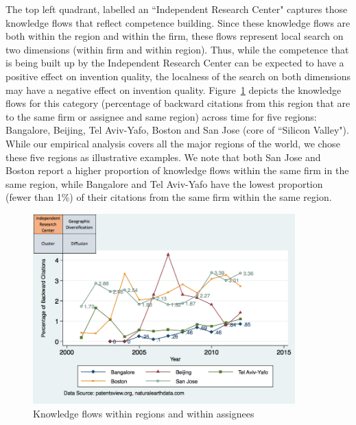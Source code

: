 \documentclass[12pt,letterpaper]{article}
\begin{document}
The top left quadrant, labelled an ``Independent Research Center" captures those knowledge flows that reflect competence building. Since these knowledge flows  are both within the region and within the firm, these flows represent local search on two dimensions (within firm and within region).  Thus, while the competence that is being built up by the Independent Research Center can be expected to have a positive effect on invention quality, the localness of the search on both dimensions may have a negative effect on invention quality. Figure~\ref{fig:SMSSameRegionSameAssigneeFlows} depicts the knowledge flows for this category (percentage of backward citations from this region that are to the same firm or assignee and same region) across time for five regions: Bangalore, Beijing, Tel Aviv-Yafo, Boston and San Jose (core of ``Silicon Valley"). While our empirical analysis covers all the major regions of the world, we chose these five regions as illustrative examples. We note that both San Jose and Boston report a higher proportion of knowledge flows within the same firm in the same region, while Bangalore and Tel Aviv-Yafo have the lowest proportion (fewer than 1\%) of their citations from the same firm within the same region. \par

\begin{figure}[h]
\begin{centering}
  \includegraphics[width=0.90\textwidth]{SMSSameRegionSameAssigneeFlows}
  \caption{Knowledge flows within regions and within assignees}
  \label{fig:SMSSameRegionSameAssigneeFlows}
\end{centering}
\end{figure}
\end{document}
